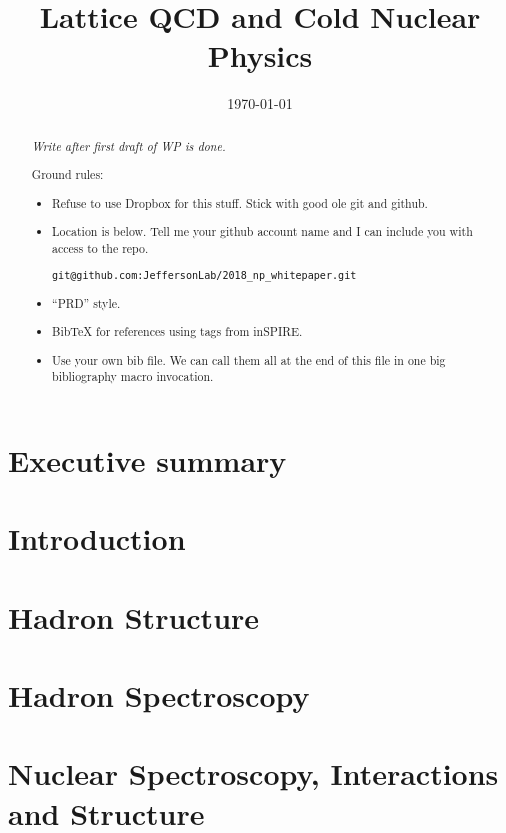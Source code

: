 \documentclass[aps,prd,nofootinbib,floatfix,superscriptaddress,preprint,tightenlines]{revtex4-1}
\begin{document}
\title{Lattice QCD and Cold Nuclear Physics}
\noaffiliation

\date{\today}
%
\begin{abstract}
\emph{Write after first draft of WP is done.}
    
Ground rules:
\begin{itemize}
    \item Refuse to use Dropbox for this stuff. Stick with good ole git and github.
    \item Location is below. Tell me your github account name and I
      can include you with access to the repo.
\begin{verbatim}git@github.com:JeffersonLab/2018_np_whitepaper.git\end{verbatim}
  \item ``PRD'' style.
  \item BibTeX for references using tags from inSPIRE.
  \item Use your own bib file. We can call them all at the end of this
    file in one big bibliography macro invocation.
\end{itemize}
\end{abstract}

\maketitle

\section{Executive summary}


\section{Introduction}


\section{Hadron Structure}


\section{Hadron Spectroscopy}


\section{Nuclear Spectroscopy, Interactions and Structure}


\begin{figure}
    \vspace*{3cm}
\end{figure}



\end{document}
